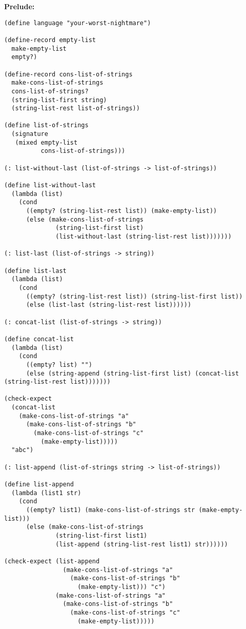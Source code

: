 \documentclass[a4paper,12pt]{article}
\begin{document}
\textbf{Prelude: }
\begin{verbatim}
(define language "your-worst-nightmare")

(define-record empty-list
  make-empty-list
  empty?)

(define-record cons-list-of-strings
  make-cons-list-of-strings
  cons-list-of-strings?
  (string-list-first string)
  (string-list-rest list-of-strings))

(define list-of-strings
  (signature
   (mixed empty-list
          cons-list-of-strings)))

(: list-without-last (list-of-strings -> list-of-strings))

(define list-without-last
  (lambda (list)
    (cond
      ((empty? (string-list-rest list)) (make-empty-list))
      (else (make-cons-list-of-strings
              (string-list-first list)
              (list-without-last (string-list-rest list)))))))

(: list-last (list-of-strings -> string))

(define list-last
  (lambda (list)
    (cond
      ((empty? (string-list-rest list)) (string-list-first list))
      (else (list-last (string-list-rest list))))))

(: concat-list (list-of-strings -> string))

(define concat-list
  (lambda (list)
    (cond
      ((empty? list) "")
      (else (string-append (string-list-first list) (concat-list (string-list-rest list)))))))

(check-expect
  (concat-list
    (make-cons-list-of-strings "a"
      (make-cons-list-of-strings "b"
        (make-cons-list-of-strings "c"
          (make-empty-list)))))
  "abc")

(: list-append (list-of-strings string -> list-of-strings))

(define list-append
  (lambda (list1 str)
    (cond
      ((empty? list1) (make-cons-list-of-strings str (make-empty-list)))
      (else (make-cons-list-of-strings
              (string-list-first list1)
              (list-append (string-list-rest list1) str))))))

(check-expect (list-append
                (make-cons-list-of-strings "a"
                  (make-cons-list-of-strings "b"
                    (make-empty-list))) "c")
              (make-cons-list-of-strings "a"
                (make-cons-list-of-strings "b"
                  (make-cons-list-of-strings "c"
                    (make-empty-list)))))


\end{verbatim}
\end{document}
